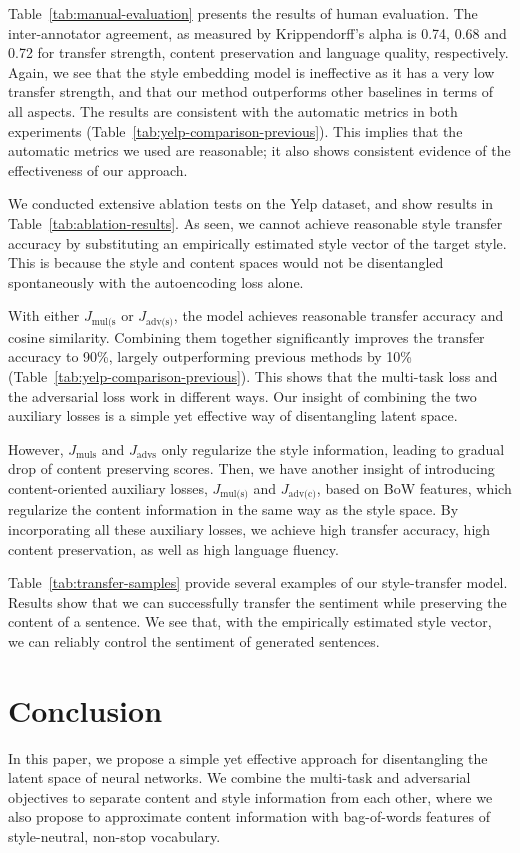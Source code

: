 \documentclass[letterpaper]{article} %
\newcommand{\loss}[1]{J_{\text{#1}}}
\begin{document}
Table~\ref{tab:manual-evaluation} presents the results of human evaluation. The inter-annotator agreement, as measured by Krippendorff's alpha \cite{krippendorff2011computing} is 0.74, 0.68 and 0.72 for transfer strength, content preservation and language quality, respectively. Again, we see that the style embedding model \cite{fu2018style} is ineffective as it has a very low transfer strength, and that our method outperforms other baselines in terms of all aspects. The results are consistent with the automatic metrics in both experiments (Table~\ref{tab:yelp-comparison-previous}). This implies that the automatic metrics we used are reasonable; it also shows consistent evidence of the effectiveness of our approach.

We conducted extensive ablation tests on the Yelp dataset, and show results in Table~\ref{tab:ablation-results}. As seen, we cannot achieve reasonable style transfer accuracy by substituting an empirically estimated style vector of  the target style.  This is because the style and content spaces would not be disentangled spontaneously with the autoencoding loss alone.

With either $\loss{mul(s}$ or $\loss{adv(s)}$, the model achieves reasonable transfer accuracy and cosine similarity. Combining them together significantly improves the transfer accuracy to 90\%, largely outperforming previous methods by 10\% (Table~\ref{tab:yelp-comparison-previous}). This shows that the multi-task loss and the adversarial loss work in different ways. Our insight of combining the two auxiliary losses is a simple yet effective way of disentangling latent space.

However, $\loss{mul{s}}$ and $\loss{adv{s}}$ only regularize the style information, leading to gradual drop of content preserving scores. Then, we have another insight of introducing content-oriented auxiliary losses, $\loss{mul(s)}$ and $\loss{adv(c)}$, based on BoW features, which regularize the content information in the same way as the style space. By incorporating all these auxiliary losses, we achieve high transfer accuracy, high content preservation, as well as high language fluency.


Table~\ref{tab:transfer-samples} provide several examples of our style-transfer model. Results show that we can successfully transfer the sentiment while preserving the content of a sentence.
We see that, with the empirically estimated style vector, we can reliably control the sentiment of generated sentences.

\section{Conclusion}
In this paper, we propose a simple yet effective approach for disentangling the latent space of neural networks. We combine the multi-task and adversarial objectives to separate content and style information from each other, where we also propose to approximate content information with bag-of-words features of style-neutral, non-stop vocabulary.
\end{document}
